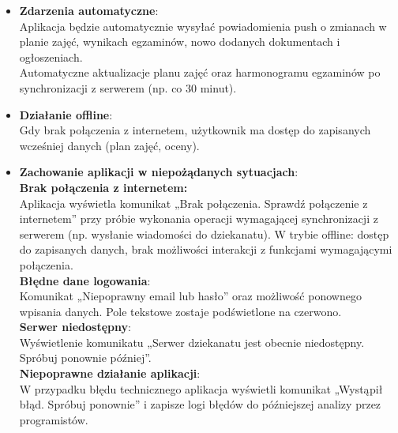 \begin{itemize}
      \item \textbf{Zdarzenia automatyczne}:
            \\Aplikacja będzie automatycznie wysyłać powiadomienia push o zmianach w planie zajęć, wynikach egzaminów, nowo dodanych dokumentach i ogłoszeniach.
            \\Automatyczne aktualizacje planu zajęć oraz harmonogramu egzaminów po synchronizacji z serwerem (np. co 30 minut).
      \item \textbf{Działanie offline}:
            \\Gdy brak połączenia z internetem, użytkownik ma dostęp do zapisanych wcześniej danych (plan zajęć, oceny).
      \item \textbf{Zachowanie aplikacji w niepożądanych sytuacjach}:
            \\\textbf{Brak połączenia z internetem:}
            \\Aplikacja wyświetla komunikat „Brak połączenia. Sprawdź połączenie z internetem” przy próbie wykonania operacji wymagającej synchronizacji z serwerem (np. wysłanie wiadomości do dziekanatu).
            W trybie offline: dostęp do zapisanych danych, brak możliwości interakcji z funkcjami wymagającymi połączenia.
            \\\textbf{Błędne dane logowania}:
            \\Komunikat „Niepoprawny email lub hasło” oraz możliwość ponownego wpisania danych. Pole tekstowe zostaje podświetlone na czerwono.
            \\\textbf{Serwer niedostępny}:
            \\Wyświetlenie komunikatu „Serwer dziekanatu jest obecnie niedostępny. Spróbuj ponownie później”.
            \\\textbf{Niepoprawne działanie aplikacji}:
            \\W przypadku błędu technicznego aplikacja wyświetli komunikat „Wystąpił błąd. Spróbuj ponownie” i zapisze logi błędów do późniejszej analizy przez programistów.
\end{itemize}
